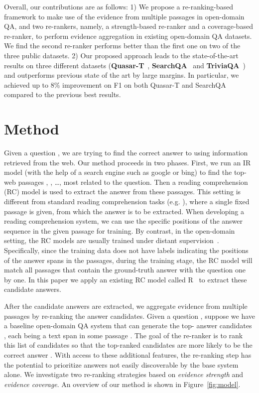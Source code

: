 \documentclass{article} \usepackage{iclr2018_conference,times}
\begin{document}
Overall, our contributions are as follows: 1) We propose a re-ranking-based framework to make use of the evidence from multiple passages in open-domain QA, and two re-rankers, namely, a strength-based re-ranker and a coverage-based re-ranker, to
perform evidence aggregation in existing open-domain QA datasets. We find the second re-ranker performs better than the first one on two of the three public datasets.
2) Our proposed approach leads to the state-of-the-art results on three different datasets (\textbf{Quasar-T}~\citep{dhingra2017quasar}, \textbf{SearchQA}~\citep{dunn2017searchqa} and \textbf{TriviaQA}~\citep{JoshiTriviaQA2017}) and outperforms previous state of the art by large margins. In particular, we achieved up to 8\% improvement on F1 on both Quasar-T and SearchQA compared to the previous best results. 







 
\section{Method}
Given a question , we are trying to find the correct answer  to  using information retrieved from the web. Our method proceeds in two phases.  First, we run an IR model (with the help of a search engine such as google or bing) to find the top- web passages , , \ldots,  most related to the question. Then a reading comprehension (RC) model is used to extract the answer from these passages.  This setting is different from standard reading comprehension tasks (e.g. \citep{rajpurkar2016squad}), where a single fixed passage is given, from which the answer is to be extracted.
When developing a reading comprehension system, we can use the specific positions of the answer sequence in the given passage for training.
By contrast, in the open-domain setting, the RC models are usually trained under distant supervision~\citep{chen2017reading,dhingra2017quasar,JoshiTriviaQA2017}. Specifically, since the training data does not have labels indicating the positions of the answer spans in the passages, during the training stage, the RC model will match all passages that contain the ground-truth answer with the question one by one.
In this paper we apply an existing RC model called R~\citep{wang2017r} to extract these candidate answers.

After the candidate answers are extracted, we aggregate evidence from multiple passages by re-ranking the answer candidates. Given a question , suppose we have a baseline open-domain QA system that can generate the top- answer candidates , each being a text span in some passage . The goal of the re-ranker is to rank this list of candidates so that the top-ranked candidates are more likely to be the correct answer . With access to these additional features, the re-ranking step has the potential to prioritize answers not easily discoverable by the base system alone. We investigate two re-ranking strategies based on \textit{evidence strength} and \textit{evidence coverage}. An overview of our method is shown in Figure~\ref{fig:model}. 
\end{document}
